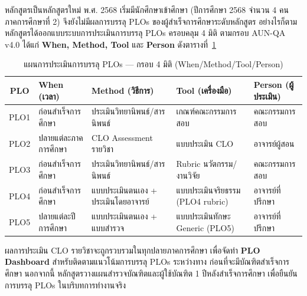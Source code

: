 
หลักสูตรเป็นหลักสูตรใหม่ พ.ศ. 2568 เริ่มมีนักศึกษาเข้าศึกษา (ปีการศึกษา 2568 จำนวน 4 คน ภาคการศึกษาที่ 2) จึงยังไม่มีผลการบรรลุ PLOs ของผู้สำเร็จการศึกษาระดับหลักสูตร อย่างไรก็ตาม หลักสูตรได้ออกแบบระบบการประเมินการบรรลุ PLOs ครอบคลุม 4 มิติ ตามกรอบ AUN-QA v4.0 ได้แก่ \textbf{When, Method, Tool} และ \textbf{Person} ดังตารางที่~\ref{tbl:plo_assessment_plan}

\begin{table}[H]
  \centering
  \caption{แผนการประเมินการบรรลุ PLOs — กรอบ 4 มิติ (When/Method/Tool/Person)}
  \label{tbl:plo_assessment_plan}
  \begingroup
  \small
  \setlength{\tabcolsep}{3pt}
  \renewcommand{\arraystretch}{1.3}
  \begin{tabularx}{\linewidth}{|c|>{\raggedright\arraybackslash}X|>{\raggedright\arraybackslash}X|>{\raggedright\arraybackslash}X|>{\raggedright\arraybackslash}X|}
    \hline
    \rowcolor{gray!15}
    \textbf{PLO} & \textbf{When (เวลา)} & \textbf{Method (วิธีการ)} & \textbf{Tool (เครื่องมือ)} & \textbf{Person (ผู้ประเมิน)} \\
    \hline
    PLO1 & ก่อนสำเร็จการศึกษา & ประเมินวิทยานิพนธ์/สารนิพนธ์ & เกณฑ์คณะกรรมการสอบ & คณะกรรมการสอบ \\
    \hline
    PLO2 & ปลายแต่ละภาคการศึกษา & CLO Assessment รายวิชา & แบบประเมิน CLO & อาจารย์ผู้สอน \\
    \hline
    PLO3 & ก่อนสำเร็จการศึกษา & ประเมินวิทยานิพนธ์/สารนิพนธ์ & Rubric นวัตกรรม/งานวิจัย & คณะกรรมการสอบ \\
    \hline
    PLO4 & ก่อนสำเร็จการศึกษา & แบบประเมินตนเอง + ประเมินโดยอาจารย์ & แบบประเมินจริยธรรม (PLO4 rubric) & อาจารย์ที่ปรึกษา \\
    \hline
    PLO5 & ปลายแต่ละปีการศึกษา & แบบประเมินตนเอง + แบบสำรวจ & แบบประเมินทักษะ Generic (PLO5) & อาจารย์ที่ปรึกษา \\
    \hline
  \end{tabularx}
  \endgroup
\end{table}

ผลการประเมิน CLO รายวิชาจะถูกรวบรวมในทุกปลายภาคการศึกษา เพื่อจัดทำ \textbf{PLO Dashboard} สำหรับติดตามแนวโน้มการบรรลุ PLOs ระหว่างทาง ก่อนที่จะมีบัณฑิตสำเร็จการศึกษา นอกจากนี้ หลักสูตรวางแผนสำรวจบัณฑิตและผู้ใช้บัณฑิต 1 ปีหลังสำเร็จการศึกษา เพื่อยืนยันการบรรลุ PLOs ในบริบทการทำงานจริง


